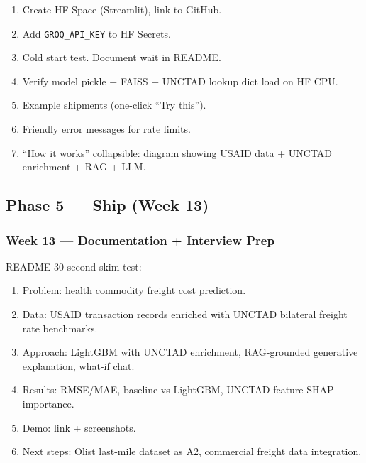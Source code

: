 \documentclass[11pt, a4paper]{article}
\begin{document}
\begin{enumerate}[noitemsep]
  \item Create HF Space (Streamlit), link to GitHub.
  \item Add \texttt{GROQ\_API\_KEY} to HF Secrets.
  \item Cold start test. Document wait in README.
  \item Verify model pickle + FAISS + UNCTAD lookup dict load on HF CPU.
  \item Example shipments (one-click ``Try this'').
  \item Friendly error messages for rate limits.
  \item ``How it works'' collapsible: diagram showing USAID data + UNCTAD enrichment + RAG + LLM.
\end{enumerate}

\subsection{Phase 5 --- Ship (Week 13)}

\subsubsection*{Week 13 --- Documentation + Interview Prep}

README 30-second skim test:
\begin{enumerate}[noitemsep]
  \item Problem: health commodity freight cost prediction.
  \item Data: USAID transaction records enriched with UNCTAD bilateral freight rate benchmarks.
  \item Approach: LightGBM with UNCTAD enrichment, RAG-grounded generative explanation, what-if chat.
  \item Results: RMSE/MAE, baseline vs LightGBM, UNCTAD feature SHAP importance.
  \item Demo: link + screenshots.
  \item Next steps: Olist last-mile dataset as A2, commercial freight data integration.
\end{enumerate}
\end{document}
